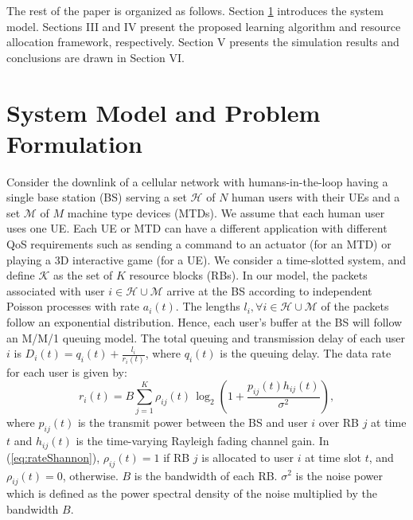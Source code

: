 \documentclass[journal,draftclsnofoot,onecolumn,12pt]{IEEEtran}%
\begin{document}
	The rest of the paper is organized as follows. Section
	\ref{sec:SysModel} introduces the system model. Sections III and IV present the proposed learning algorithm and resource allocation framework, respectively.
	Section V presents the simulation results and conclusions are drawn
	in Section VI.
	


	\section{System Model and Problem Formulation}\label{sec:SysModel}
	Consider the downlink of a  cellular network with humans-in-the-loop having a single base station (BS) serving a set $\mathcal{H}$ of $N$ human users with their UEs and a set $\mathcal{M}$ of  $M$ machine type devices (MTDs). {We assume that each human user uses one UE.} Each UE or MTD can have a different application with different QoS requirements such as sending a command to an actuator (for an MTD) or playing a 3D interactive game (for a UE).  We consider a time-slotted system, 
    and define $\mathcal{K}$ as the set of $K$ resource blocks (RBs).
	In our model, the packets associated with user  $i \in \mathcal{H}\cup \mathcal{M}$ arrive at the BS according to independent Poisson processes with rate $a_i(t)$. The lengths $l_i, \forall i \in \mathcal{H}\cup \mathcal{M}$ of the packets follow an exponential distribution.  Hence, each user's buffer at the BS will follow an M/M/1 queuing model. The total queuing and transmission delay of each user $i$ is $D_i(t)=q_i(t)+\frac{l_i}{r_i(t)}$, where $q_i(t)$ is the queuing delay.
	The data rate for each user is given by:
	\begin{equation}\label{eq:rateShannon}
	r_i(t)=B \sum_{j=1}^{K} \rho_{ij}(t)\,\log_2\left(1+\frac{p_{ij}(t) h_{ij}(t)}{\sigma^2}\right),
	\end{equation}
	where 	$p_{ij}(t)$ is the transmit power between the BS and user $i$ over RB $j$ at  time $t$ and $h_{ij}(t)$ is the time-varying Rayleigh fading channel gain. In (\ref{eq:rateShannon}), 
    $\rho_{ij}(t)=1$ if RB $j$ is allocated to user $i$ at time slot $t$, and $\rho_{ij}(t) =0$, otherwise.  $B$ is the bandwidth of each RB. {$\sigma^2$ is the noise power which is defined as the power spectral density of the noise multiplied by the bandwidth $B$.}
\end{document}
